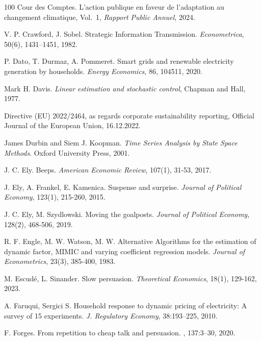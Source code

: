 \documentclass[a4paper,10pt]{article}
\theoremstyle{definition}
\theoremstyle{plain}
\numberwithin{equation}{section}
\begin{document}
\begin{thebibliography}{100}
Cour des Comptes. L’action publique en faveur de l’adaptation au changement climatique, Vol.~1, {\em Rapport Public Annuel}, 2024.

V. P. Crawford, J. Sobel. Strategic Information Transmission. {\em Econometrica}, 50(6), 1431–1451, 1982.

P. Dato,  T. Durmaz, A. Pommeret. Smart grids and renewable electricity generation by households. {\em Energy Economics}, 86, 104511, 2020.

Mark H. Davis. {\em Linear estimation and stochastic control}, Chapman and Hall, 1977.

Directive (EU) 2022/2464, as regards corporate sustainability reporting, Official Journal of the European Union, 16.12.2022.

James Durbin and Siem J. Koopman. {\em Time Series Analysis by State Space Methods}. Oxford University Press, 2001.

J. C. Ely. Beeps. {\em American Economic Review}, 107(1), 31-53, 2017.

J. Ely, A. Frankel, E.  Kamenica. Suspense and surprise. {\em Journal of Political Economy}, 123(1), 215-260, 2015.

J. C. Ely,  M. Szydlowski. Moving the goalposts. {\em Journal of Political Economy}, 128(2), 468-506, 2019.

R. F. Engle, M. W. Watson, M. W. Alternative Algorithms for the estimation of dynamic factor, MIMIC and varying coefficient regression models. \textit{Journal of Econometrics}, 23(3), 385-400, 1983.
 

M. Escudé, L.  Sinander. Slow persuasion. {\em Theoretical Economics}, 18(1), 129-162, 2023.

A. Faruqui, Sergici S. Household response to dynamic pricing of electricity: A survey of 15 experiments. {\em J. Regulatory Economy}, 38:193--225, 2010.


F. Forges.
\newblock From repetition to cheap talk and persuasion.
, 137:3--30, 2020.


\end{thebibliography}
\end{document}
